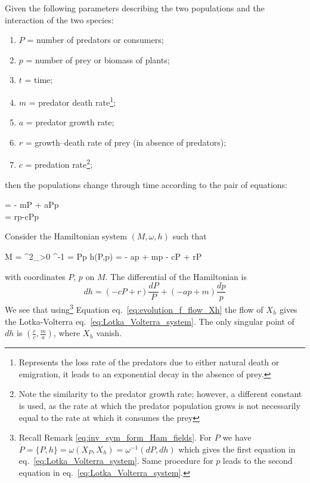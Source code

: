 \documentclass[main.tex]{subfiles}
\begin{document}
\begin{example}
	Given the following parameters describing the two populations and the interaction of the two species:
	\begin{enumerate}
		\item $P$ = number of predators or consumers;
		\item $p$ = number of prey or biomass of plants;
		\item $t$ = time;
		\item $m$ = predator death rate\footnote{Represents the loss rate of the predators due to either natural death or emigration, it leads to an exponential decay in the absence of prey.};
		\item $a$ = predator growth rate;
		\item $r$ = growth--death rate of prey (in absence of predators);
		\item $c$ = predation rate\footnote{Note the similarity to the predator growth rate; however, a different constant is used, as the rate at which the predator population grows is not necessarily equal to the rate at which it consumes the prey};
	\end{enumerate}
	then the populations change through time according to the pair of equations:
	\begin{eqalign}
	\label{eq:Lotka_Volterra_system}
		\begin{dcases}
			 = - mP + aPp\\
			 = rp-cPp
		\end{dcases}
	\end{eqalign}
	Consider the Hamiltonian system $(M, \omega, h)$ such that
	\begin{eqalign}
		M = \R^2_{>0} \qquad \omega^{-1} = Pp  \wedge {} \qquad h(P,p) = - ap + m\log p - cP + r\log P
	\end{eqalign}
	with coordinates $P$, $p$ on $M$. The differential of the Hamiltonian is 
	\begin{equation}
		dh = (- cP + r) \frac {dP}{P} + (- ap + m) \frac {dp}{p}
	\end{equation}
	We see that using\footnote{Recall Remark \ref{eq:inv_sym_form_Ham_fields}. For $P$ we have $\dot P = \{P, h\} = \omega(X_P, X_h) = \omega^{-1}(dP, dh)$ which gives the first equation in eq.~\eqref{eq:Lotka_Volterra_system}. Same procedure for $p$ leads to the second equation in eq.~\eqref{eq:Lotka_Volterra_system}.} Equation eq.~\eqref{eq:evolution_f_flow_Xh} the flow of $X_h$ gives the Lotka-Volterra eq.~\eqref{eq:Lotka_Volterra_system}.
	The only singular point of $dh$ is $\left ( \frac {r}{c}, \frac{m}{a} \right)$, where $X_h$ vanish. 
	

\end{example}
\end{document}
